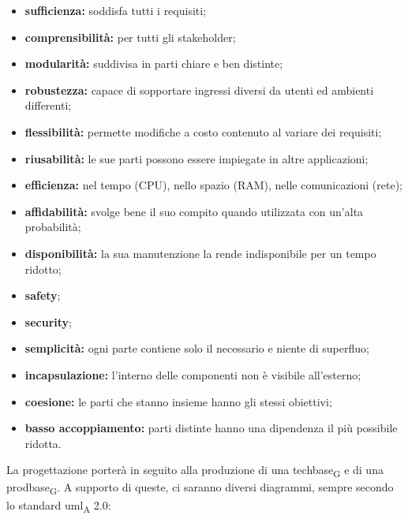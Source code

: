                 \begin{itemize}
                    \item \textbf{sufficienza: }soddisfa tutti i requisiti;
                    \item \textbf{comprensibilità: }per tutti gli stakeholder;
                    \item \textbf{modularità: }suddivisa in parti chiare e ben distinte;
                    \item \textbf{robustezza: }capace di sopportare ingressi diversi da utenti ed ambienti differenti;
                    \item \textbf{flessibilità: }permette modifiche a costo contenuto al variare dei requisiti;
                    \item \textbf{riusabilità: }le sue parti possono essere impiegate in altre applicazioni;
                    \item \textbf{efficienza: }nel tempo (CPU), nello spazio (RAM), nelle comunicazioni (rete);
                    \item \textbf{affidabilità: }svolge bene il suo compito quando utilizzata con un'alta probabilità;
                    \item \textbf{disponibilità: }la sua manutenzione la rende indisponibile per un tempo ridotto;
                    \item \textbf{safety};
                    \item \textbf{security};
                    \item \textbf{semplicità: }ogni parte contiene solo il necessario e niente di superfluo;
                    \item \textbf{incapsulazione: }l'interno delle componenti non è visibile all'esterno;
                    \item \textbf{coesione: }le parti che stanno insieme hanno gli stessi obiettivi;
                    \item \textbf{basso accoppiamento: }parti distinte hanno una dipendenza il più possibile ridotta.
                \end{itemize}
                La progettazione porterà in seguito alla produzione di una \gls{techbase}\textsubscript{G} e di una \gls{prodbase}\textsubscript{G}. A supporto di queste, ci saranno diversi diagrammi, sempre secondo lo standard \acrshort{uml}\textsubscript{A} 2.0:
